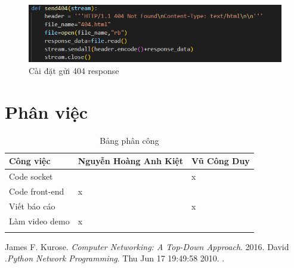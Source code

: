 \documentclass[14pt]{extreport}
\begin{document}
\begin{center}
    \begin{figure}[H]
    \begin{center}
     \includegraphics[scale=.8]{404 implement.PNG}
    \end{center}
    \caption{Cài đặt gửi 404 response}
    \end{figure}
\end{center}

\chapter{Phân việc}
\begin{longtable}[c]{|l|l|l|}
\hline
Công việc      & Nguyễn Hoàng Anh Kiệt     & Vũ Công Duy               \\ \hline
\endhead
%
Code socket    &                           & \cellcolor[HTML]{FCFF2F}x \\ \hline
Code front-end & \cellcolor[HTML]{FCFF2F}x &                           \\ \hline
Viết báo cáo   &                           & \cellcolor[HTML]{FCFF2F}x \\ \hline
Làm video demo & \cellcolor[HTML]{FCFF2F}x &                           \\ \hline
\caption{Bảng phân công}
\label{tab:my-table}\\
\end{longtable}
\begin{thebibliography}{3}
 James F. Kurose. {\it Computer Networking: A Top-Down Approach}. 2016.
 David .{\it Python Network Programming}. Thu Jun 17 19:49:58 2010.
.

\end{thebibliography}
\end{document}
